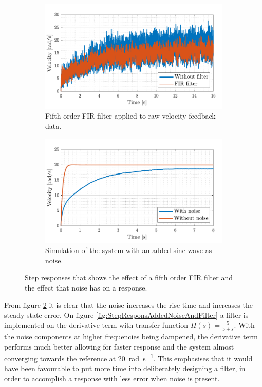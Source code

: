 \documentclass[../../main.tex]{subfiles}
\begin{document}
\begin{figure}[H]
     \centering
     \begin{subfigure}[b]{0.49\textwidth}
         \centering
    \includegraphics[width=\textwidth]{Sections/Miscellaneous/Images/FilteredStepRespons5Order.pdf}
    \caption{Fifth order FIR filter applied to raw velocity feedback data.}
    \label{fig:FilteredStepRespons5Order}
     \end{subfigure}
     \hfill
     \begin{subfigure}[b]{0.49\textwidth}
         \centering
         \includegraphics[width=\textwidth]{Sections/Miscellaneous/Images/StepResponsAddedNoise.pdf}
         \caption{Simulation of the system with an added sine wave as noise.}
         \label{fig:StepResponsAddedNoise}
     \end{subfigure}
        \caption{Step responses that shows the effect of a fifth order FIR filter and the effect that noise has on a response.}
        \label{fig:FilterDiskussionImplementedFilter}
\end{figure}
From figure \ref{fig:StepResponsAddedNoise} it is clear that the noise increases the rise time and increases the steady state error. On figure \ref{fig:StepResponsAddedNoiseAndFilter} a filter is implemented on the derivative term with transfer function $H(s) = \frac{5}{5+s}$. With the noise components at higher frequencies being dampened, the derivative term performs much better allowing for faster response and the system almost converging towards the reference at \SI{20}{\radian \per \second}. This emphasises that it would have been favourable to put more time into deliberately designing a filter, in order to accomplish a response with less error when noise is present.
\end{document}
